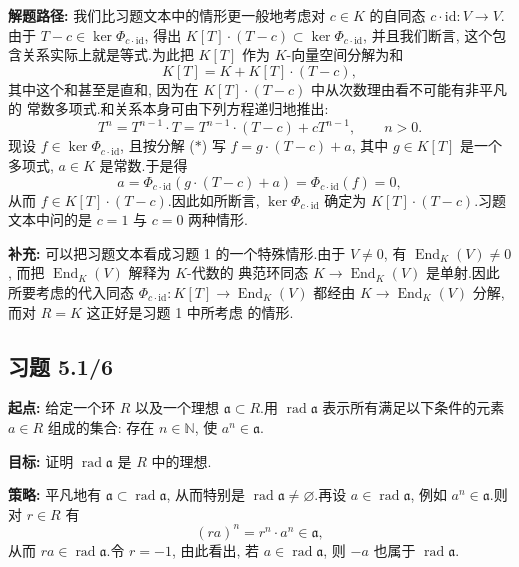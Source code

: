 \noindent\textbf{解题路径:} 我们比习题文本中的情形更一般地考虑对 $c \in K$ 的自同态
$c \cdot \mathrm{id} \colon V \longrightarrow V$.由于 $T - c \in \ker
\Phi_{c \cdot \mathrm{id}}$, 得出 $K[T] \cdot (T - c) \subset \ker
\Phi_{c \cdot \mathrm{id}}$, 并且我们断言, 这个包含关系实际上就是等式.为此把
$K[T]$ 作为 $K$-向量空间分解为和
\begin{equation}
K[T] = K + K[T] \cdot (T - c), \tag{$*$}
\end{equation}
其中这个和甚至是直和, 因为在 $K[T] \cdot (T - c)$ 中从次数理由看不可能有非平凡的
常数多项式.和关系本身可由下列方程递归地推出:
\[
T^n = T^{n - 1} \cdot T = T^{n - 1} \cdot (T - c) + cT^{n - 1}, \qquad n > 0\text{.}
\]
现设 $f \in \ker \Phi_{c \cdot \mathrm{id}}$, 且按分解 ($*$) 写 $f = g \cdot (T - c) + a$,
其中 $g \in K[T]$ 是一个多项式, $a \in K$ 是常数.于是得
\[
a = \Phi_{c \cdot \mathrm{id}}(g \cdot (T - c) + a) = \Phi_{c \cdot \mathrm{id}}(f) = 0,
\]
从而 $f \in K[T] \cdot (T - c)$.因此如所断言,
$\ker \Phi_{c \cdot \mathrm{id}}$ 确定为 $K[T] \cdot (T - c)$.习题文本中问的是
$c = 1$ 与 $c = 0$ 两种情形.

\noindent\textbf{补充:} 可以把习题文本看成习题 1 的一个特殊情形.由于 $V \neq 0$, 有
$\operatorname{End}_K(V) \neq 0$, 而把 $\operatorname{End}_K(V)$ 解释为 $K$-代数的
典范环同态 $K \longrightarrow \operatorname{End}_K(V)$ 是单射.因此所要考虑的代入同态
$\Phi_{c \cdot \mathrm{id}} \colon K[T] \longrightarrow \operatorname{End}_K(V)$ 都经由
$K \longrightarrow \operatorname{End}_K(V)$ 分解, 而对 $R = K$ 这正好是习题 1 中所考虑
的情形.

\subsection*{习题 5.1/6}

\noindent\textbf{起点:} 给定一个环 $R$ 以及一个理想 $\mathfrak{a} \subset R$.用
$\operatorname{rad} \mathfrak{a}$ 表示所有满足以下条件的元素 $a \in R$ 组成的集合:
存在 $n \in \mathbb{N}$, 使 $a^n \in \mathfrak{a}$.

\noindent\textbf{目标:} 证明 $\operatorname{rad} \mathfrak{a}$ 是 $R$ 中的理想.

\noindent\textbf{策略:} 平凡地有 $\mathfrak{a} \subset \operatorname{rad} \mathfrak{a}$,
从而特别是 $\operatorname{rad} \mathfrak{a} \neq \varnothing$.再设 $a \in \operatorname{rad}
\mathfrak{a}$, 例如 $a^n \in \mathfrak{a}$.则对 $r \in R$ 有
\[
(ra)^n = r^n \cdot a^n \in \mathfrak{a},
\]
从而 $ra \in \operatorname{rad} \mathfrak{a}$.令 $r = -1$, 由此看出, 若
$a \in \operatorname{rad} \mathfrak{a}$, 则 $-a$ 也属于 $\operatorname{rad} \mathfrak{a}$.

